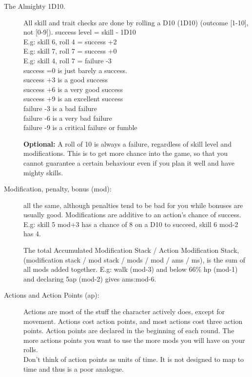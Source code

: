 \begin{description}

\item[The Almighty 1D10.] All skill and trait checks are done by rolling a D10 (1D10) (outcome [1-10], not [0-9]).
success level = skill - 1D10 \\
E.g: skill 6, roll 4 = success +2 \\
E.g: skill 7, roll 7 = success +0 \\
E.g: skill 4, roll 7 = failure -3 \\
success =0 is just barely a success. \\
success +3 is a good success \\
success +6 is a very good success \\
success +9 is an excellent success \\
failure -3 is a bad failure \\
failure -6 is a very bad failure \\
failure -9 is a critical failure or fumble

\textbf{Optional:} A roll of 10 is always a failure, regardless of skill level and modifications. This is to get more chance into the game, so that you cannot guarantee a certain behaviour even if you plan it well and have mighty skills.

\item[Modification, penalty, bonus (mod):] all the same, although penalties tend to be bad for you while bonuses are usually good. Modifications are additive to an action's chance of success. \\
E.g: skill 5 mod+3 has a chance of 8 on a D10 to succeed, skill 6 mod-2 has 4.

The total Accumulated Modification Stack / Action Modification Stack, (modification stack / mod stack / mods / mod / ams / ms), is the sum of all mods added together.
E.g: walk (mod-3) and below 66\% hp (mod-1) and declaring 5ap (mod-2) gives ams:mod-6.

\item[Actions and Action Points (ap):]
Actions are most of the stuff the character actively does, except for movement. Actions cost action points, and most actions cost three action points.
Action points are declared in the beginning of each round. The more actions points you want to use the more mods you will have on your rolls.\\
Don't think of action points as units of time. It is not designed to map to time and thus is a poor analogue.


\end{description}
